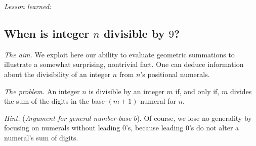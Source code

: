 \noindent \textit{Lesson learned:}



\subsection{When is integer $n$ divisible by $9$?}
\label{sec:divisible-by-9}


\noindent \textit{The aim.}
We exploit here our ability to evaluate geometric summations to
illustrate a somewhat surprising, nontrivial fact.  One can deduce
information about the divisibility of an integer $n$ from $n$'s
positional numerals.  
\medskip

\noindent \textit{The problem.}
An integer $n$ is divisible by an integer $m$ if, and only if, $m$
divides the sum of the digits in the base-$(m+1)$ numeral for $n$.
%
\medskip

\noindent \textit{Hint.}
({\it Argument for general number-base $b$}).
%
Of course, we lose no generality by focusing on numerals without
leading $0$'s, because leading $0$'s do not alter a numeral's sum of
digits.

